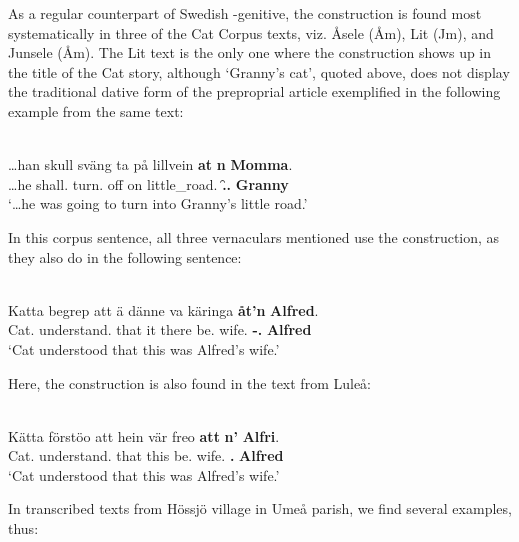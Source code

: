 As a regular counterpart of Swedish -genitive, the  construction is\textit{ }found most systematically in three of the Cat Corpus texts, viz. Åsele (Åm), Lit (Jm), and Junsele (Åm). The Lit text is the only one where the  construction shows up in the title of the Cat story, although ‘Granny’s cat’, quoted above, does not display the traditional dative form  of the preproprial article exemplified in the following example from the same text:

\ea%
\\
\gll …han  skull  sväng  ta  på  lillvein  \textbf{at} \textbf{n} \textbf{Momma}.\\
…he  shall.{\pst}  turn.{\inf} off  on  little\_road.{}  \textbf{{\poss}} \textbf{{\pda}.{\f}.{\dat}} \textbf{Granny}\\
\glt ‘…he was going to turn into Granny’s little road.’
\z

In this corpus sentence, all three vernaculars mentioned use the  construction, as they also do in the following sentence:

\ea%
\\
\gll Katta  begrep  att  ä  dänne  va  käringa  \textbf{åt’n} \textbf{Alfred}.\\
Cat.{}  understand.{\pst}  that  it  there  be.{\pst}  wife.{}  \textbf{{\poss}-{\pda}.{\m}} \textbf{Alfred}\\
\glt ‘Cat understood that this was Alfred’s wife.’
\z

Here, the construction is also found in the text from Luleå:


\ea%
\\
\gll Kätta  förstöo  att  hein  vär  freo  \textbf{att} \textbf{n’} \textbf{Alfri}.\\
Cat.{}  understand.{\pst}  that  this  be.{\pst}  wife.{}  \textbf{{\poss}} \textbf{{\pda}.{\m}} \textbf{Alfred}\\
\glt ‘Cat understood that this was Alfred’s wife.’
\z

In transcribed texts from Hössjö village in Umeå parish, we find several examples, thus:

